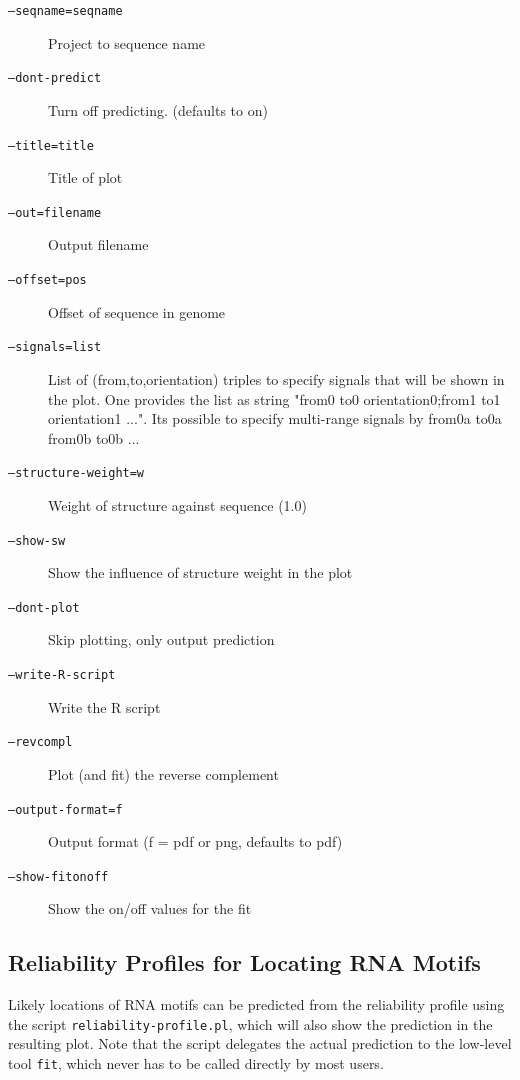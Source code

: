 \documentclass{article}
\begin{document}
\begin{description}
       \item[\texttt{--seqname=seqname}]       Project to sequence name
       \item[\texttt{--dont-predict}]          Turn off predicting. (defaults to on)
       \item[\texttt{--title=title}]           Title of plot
       \item[\texttt{--out=filename}]          Output filename
       \item[\texttt{--offset=pos}]            Offset of sequence in genome
       \item[\texttt{--signals=list}] List of (from,to,orientation)
         triples to specify signals that will be shown in the plot.
         One provides the list as string "from0 to0 orientation0;from1
         to1 orientation1 ...". Its possible to specify multi-range
         signals by from0a to0a from0b to0b ...
       \item[\texttt{--structure-weight=w}]    Weight of structure against sequence (1.0)
       \item[\texttt{--show-sw}]               Show the influence of structure weight in the plot
       \item[\texttt{--dont-plot}]             Skip plotting, only output prediction
       \item[\texttt{--write-R-script}]        Write the R script
       \item[\texttt{--revcompl}]              Plot (and fit) the reverse complement
       \item[\texttt{--output-format=f}]       Output format (f = pdf or png, defaults to pdf)
       \item[\texttt{--show-fitonoff}]         Show the on/off values for the fit

\end{description}

\subsection{Reliability Profiles for Locating RNA Motifs}

Likely locations of RNA motifs can be predicted from the reliability
profile using the script \texttt{reliability-profile.pl}, which will
also show the prediction in the resulting plot.  Note that the script
delegates the actual prediction to the low-level tool \texttt{fit},
which never has to be called directly by most users.
\end{document}
